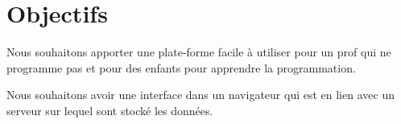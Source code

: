 \section{Objectifs}
Nous souhaitons apporter une plate-forme facile à utiliser pour un prof qui ne programme pas et pour des enfants pour apprendre la programmation. 

Nous souhaitons avoir une interface dans un navigateur qui est en lien avec un serveur sur lequel sont stocké les données.
